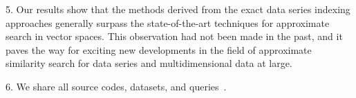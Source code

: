 5. Our results show that the methods derived from the exact data series indexing approaches generally surpass the state-of-the-art techniques for approximate search in vector spaces. 
This observation had not been made in the past, and it paves the way for exciting new developments in the field of approximate similarity search for data series and multidimensional data at large. 
 

6. We share all source codes, datasets, and queries~\cite{url/DSSeval2}. %





